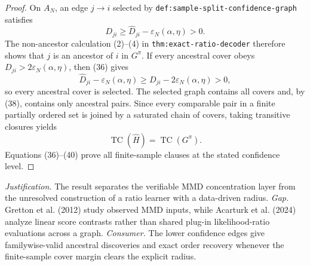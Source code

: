 \documentclass{article}
\begin{document}
\begin{proof}
On \(A_N\), an edge \(j\to i\) selected by \texttt{def:sample-split-confidence-graph} satisfies
\[
 D_{ji}\ge\widehat D_{ji}-\varepsilon_N(\alpha,\eta)>0.
\tag{38}
\]
The non-ancestor calculation (2)--(4) in \texttt{thm:exact-ratio-decoder} therefore shows that \(j\) is an ancestor of \(i\) in \(G^\pi\).  If every ancestral cover obeys \(D_{ji}>2\varepsilon_N(\alpha,\eta)\), then (36) gives
\[
 \widehat D_{ji}-\varepsilon_N(\alpha,\eta)
 \ge D_{ji}-2\varepsilon_N(\alpha,\eta)>0,
\tag{39}
\]
so every ancestral cover is selected.  The selected graph contains all covers and, by (38), contains only ancestral pairs.  Since every comparable pair in a finite partially ordered set is joined by a saturated chain of covers, taking transitive closures yields
\[
 \operatorname{TC}(\widehat H)=\operatorname{TC}(G^\pi).
\tag{40}
\]
Equations (36)--(40) prove all finite-sample clauses at the stated confidence level.
\end{proof}
\par\smallskip\noindent \textit{Justification.} The result separates the verifiable MMD concentration layer from the unresolved construction of a ratio learner with a data-driven radius. \textit{Gap.} Gretton et al. (2012) study observed MMD inputs, while Acarturk et al. (2024) analyze linear score contrasts rather than shared plug-in likelihood-ratio evaluations across a graph. \textit{Consumer.} The lower confidence edges give familywise-valid ancestral discoveries and exact order recovery whenever the finite-sample cover margin clears the explicit radius.
\end{document}
